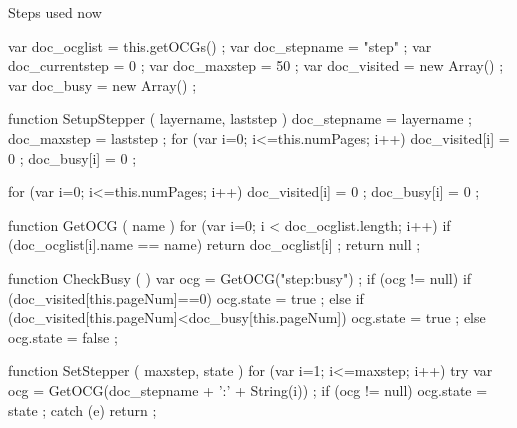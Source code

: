 
\startJSpreamble Steps used now



    var doc_ocglist     = this.getOCGs() ;
    var doc_stepname    = "step" ;
    var doc_currentstep =  0 ;
    var doc_maxstep     = 50 ;
    var doc_visited     = new Array() ;
    var doc_busy        = new Array() ;


    function SetupStepper ( layername, laststep ) {
        doc_stepname = layername ;
        doc_maxstep  = laststep ;
        for (var i=0; i<=this.numPages; i++) {
            doc_visited[i] = 0 ;
            doc_busy[i] = 0 ;
        }
    }


    for (var i=0; i<=this.numPages; i++) {
        doc_visited[i] = 0 ;
        doc_busy[i] = 0 ;
    }

    function GetOCG ( name ) {
        for (var i=0; i < doc_ocglist.length; i++) {
            if (doc_ocglist[i].name == name) {
                return doc_ocglist[i] ;
            }
        }
        return null ;
    }

    function CheckBusy ( ) {
         var ocg = GetOCG("step:busy") ;
         if (ocg != null) {
             if (doc_visited[this.pageNum]==0) {
                 ocg.state = true ;
             } else {
                 if (doc_visited[this.pageNum]<doc_busy[this.pageNum]) {
                     ocg.state = true ;
                 } else {
                     ocg.state = false ;
                 }
             }
         }
    }

    function SetStepper ( maxstep, state ) {
        for (var i=1; i<=maxstep; i++) {
            try {
                var ocg = GetOCG(doc_stepname + ':' + String(i)) ;
                if (ocg != null) {
                    ocg.state = state ;
                }
            } catch (e) {
                return ;
            }
        }
    }

